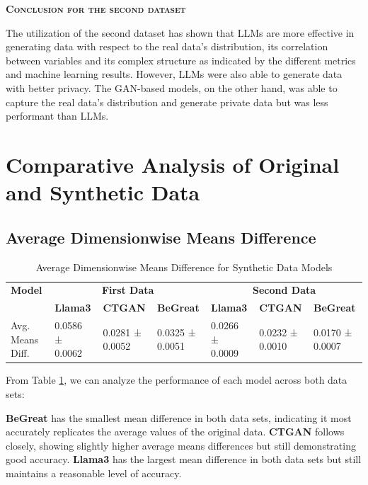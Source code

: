\vspace{1cm}

\noindent \textsc{ \textbf{Conclusion for the second dataset}}

The utilization of the second dataset has shown that LLMs are more effective in generating data with respect to the real data's distribution, its correlation between variables and its complex structure as indicated by the different metrics and machine learning results. However, LLMs were also able to generate data with better privacy. The GAN-based models, on the other hand, was able to capture the real data's distribution and generate private data but was less performant than LLMs. 




\vspace{10cm}




\section{Comparative Analysis of Original and Synthetic Data}

\subsection{Average Dimensionwise Means Difference}

\begin{table}[H]
\centering
\caption{Average Dimensionwise Means Difference for Synthetic Data Models}
\label{tab:avg_means_diff_combined}
\begin{tabularx}{\textwidth}{l*{6}{X}}
    \toprule
    \textbf{Model} & \multicolumn{3}{c}{\textbf{First Data}} & \multicolumn{3}{c}{\textbf{Second Data}} \\
    \cmidrule(lr){2-4} \cmidrule(lr){5-7}
    & \textbf{Llama3} & \textbf{CTGAN} & \textbf{BeGreat} & \textbf{Llama3} & \textbf{CTGAN} & \textbf{BeGreat} \\
    \midrule
    Avg. Means Diff. & 0.0586 ± 0.0062 & 0.0281 ± 0.0052 & 0.0325 ± 0.0051 & 0.0266 ± 0.0009 & 0.0232 ± 0.0010 & 0.0170 ± 0.0007 \\
    \bottomrule
\end{tabularx}
\end{table}



From Table \ref{tab:avg_means_diff_combined}, we can analyze the performance of each model across both data sets:

\textbf{BeGreat} has the smallest mean difference in both data sets, indicating it most accurately replicates the average values of the original data.
\textbf{CTGAN} follows closely, showing slightly higher average means differences but still demonstrating good accuracy.
\textbf{Llama3} has the largest mean difference in both data sets but still maintains a reasonable level of accuracy.

